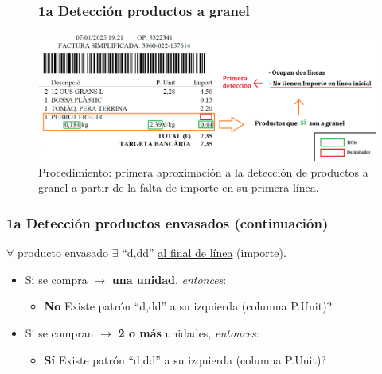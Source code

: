 \documentclass{beamer}
\begin{document}
	
		\begin{frame}	
			\begin{figure}
				\frametitle{1a Detección productos a granel}
				\centering
				\includegraphics[width=1\linewidth]{imgEspecifiques/ticketExtraccioN2}
				\caption{Procedimiento: primera aproximación a la detección de productos a granel a partir de la falta de importe en su primera línea.}
				\label{fig:ticketextraccionN2}
			\end{figure}
		\end{frame}
	
		\begin{frame}
			\frametitle{1a Detección productos envasados (continuación)}
			
			
			$\forall$ producto envasado $\exists$ ``d,dd'' \underline{al final de línea} (importe).
			
			\begin{itemize}
				\item Si se compra $\rightarrow$ \textbf{una unidad}, \textit{entonces}:
				\begin{itemize}
					\item \textbf{No} Existe patrón ``d,dd'' a su izquierda (columna P.Unit)?
				\end{itemize}
				\item Si se compran $\rightarrow$ \textbf{2 o más} unidades, \textit{entonces}:
				\begin{itemize}
					\item \textbf{Sí} Existe patrón ``d,dd'' a su izquierda (columna P.Unit)?
				\end{itemize}
			\end{itemize}
		\end{frame}
	
\end{document}
